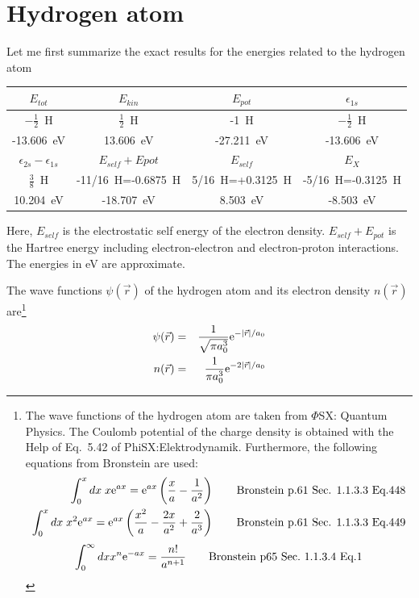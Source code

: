\documentclass[11pt,a4paper]{report}
\begin{document}
\section{Hydrogen atom}
\label{sec:exacthatom}

Let me first summarize the exact results for the energies related to
the hydrogen atom
\begin{center}
\begin{tabular}{|c|c|c|c|}
\hline
\hline
$E_{tot}$         & $E_{kin}$       & $E_{pot}$ & $\epsilon_{1s}$  \\
\hline
$-\frac{1}{2}$~H & $\frac{1}{2}$~H & -1~H     & $-\frac{1}{2}$~H \\
-13.606~eV & 13.606~eV & -27.211~eV & -13.606~eV \\
\hline
\hline
 $\epsilon_{2s}-\epsilon_{1s}$ & $E_{self}+E{pot}$ & $E_{self}$ & $E_X$ \\
\hline
 $\frac{3}{8}$~H              & -11/16~H=-0.6875~H & 5/16~H=+0.3125~H & -5/16~H=-0.3125~H\\
 10.204~eV & -18.707~eV & 8.503~eV &-8.503~eV\\
\hline
\hline
\end{tabular}
\end{center}
Here, $E_{self}$ is the electrostatic self energy of the electron
density. $E_{self}+E_{pot}$ is the Hartree energy including
electron-electron and electron-proton interactions. The energies in eV
are approximate.


The wave functions $\psi(\vec{r})$ of the hydrogen atom and its
electron density $n(\vec{r})$ are\footnote{The wave functions of the
  hydrogen atom are taken from $\Phi$SX: Quantum Physics. The Coulomb
  potential of the charge density is obtained with the Help of
  Eq.~5.42 of PhiSX:Elektrodynamik. Furthermore, the following
  equations from Bronstein are used:
\begin{eqnarray}
\int_0^x dx\; x\mathrm{e}^{ax}= \mathrm{e}^{ax}\left(\frac{x}{a}-\frac{1}{a^2}\right)
\qquad\text{Bronstein p.61 Sec. 1.1.3.3 Eq.448} \nonumber\\ \int_0^x
dx\; x^2\mathrm{e}^{ax}=
\mathrm{e}^{ax}\left(\frac{x^2}{a}-\frac{2x}{a^2}+\frac{2}{a^3}\right)
\qquad\text{Bronstein p.61 Sec. 1.1.3.3 Eq.449}
\end{eqnarray}
\begin{eqnarray}
\int_0^\infty dx x^n\mathrm{e}^{-ax}=\frac{n!}{a^{n+1}} \qquad\text{Bronstein p65 Sec.~1.1.3.4 Eq.1}
\end{eqnarray}
} 
\begin{eqnarray}
\psi(\vec{r})&=&\frac{1}{\sqrt{\pi a_0^3}}\mathrm{e}^{-|\vec{r}|/a_0}
\nonumber\\
n(\vec{r})&=&\frac{1}{\pi a_0^3}\mathrm{e}^{-2|\vec{r}|/a_0}
\end{eqnarray}
\end{document}
